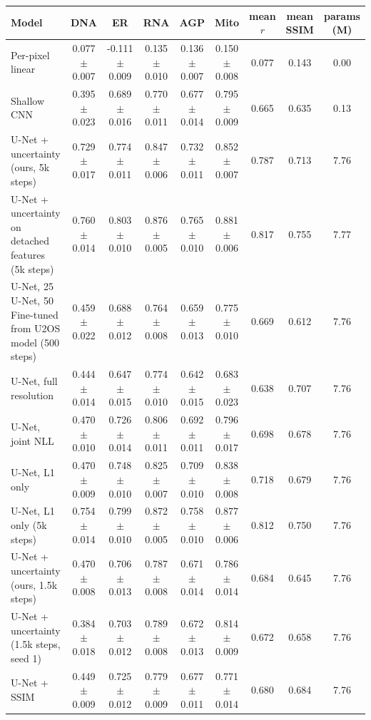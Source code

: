 \begin{tabular}{lcccccccc}
\toprule
Model & DNA & ER & RNA & AGP & Mito & mean $r$ & mean SSIM & params (M) \\
\midrule
Per-pixel linear & 0.077 $\pm$ 0.007 & -0.111 $\pm$ 0.009 & 0.135 $\pm$ 0.010 & 0.136 $\pm$ 0.007 & 0.150 $\pm$ 0.008 & 0.077 & 0.143 & 0.00 \\
Shallow CNN & 0.395 $\pm$ 0.023 & 0.689 $\pm$ 0.016 & 0.770 $\pm$ 0.011 & 0.677 $\pm$ 0.014 & 0.795 $\pm$ 0.009 & 0.665 & 0.635 & 0.13 \\
U-Net + uncertainty (ours, 5k steps) & 0.729 $\pm$ 0.017 & 0.774 $\pm$ 0.011 & 0.847 $\pm$ 0.006 & 0.732 $\pm$ 0.011 & 0.852 $\pm$ 0.007 & 0.787 & 0.713 & 7.76 \\
U-Net + uncertainty on detached features (5k steps) & 0.760 $\pm$ 0.014 & 0.803 $\pm$ 0.010 & 0.876 $\pm$ 0.005 & 0.765 $\pm$ 0.010 & 0.881 $\pm$ 0.006 & 0.817 & 0.755 & 7.77 \\
U-Net, 25%
U-Net, 50%
Fine-tuned from U2OS model (500 steps) & 0.459 $\pm$ 0.022 & 0.688 $\pm$ 0.012 & 0.764 $\pm$ 0.008 & 0.659 $\pm$ 0.013 & 0.775 $\pm$ 0.010 & 0.669 & 0.612 & 7.76 \\
U-Net, full resolution & 0.444 $\pm$ 0.014 & 0.647 $\pm$ 0.015 & 0.774 $\pm$ 0.010 & 0.642 $\pm$ 0.015 & 0.683 $\pm$ 0.023 & 0.638 & 0.707 & 7.76 \\
U-Net, joint NLL & 0.470 $\pm$ 0.010 & 0.726 $\pm$ 0.014 & 0.806 $\pm$ 0.011 & 0.692 $\pm$ 0.011 & 0.796 $\pm$ 0.017 & 0.698 & 0.678 & 7.76 \\
U-Net, L1 only & 0.470 $\pm$ 0.009 & 0.748 $\pm$ 0.010 & 0.825 $\pm$ 0.007 & 0.709 $\pm$ 0.010 & 0.838 $\pm$ 0.008 & 0.718 & 0.679 & 7.76 \\
U-Net, L1 only (5k steps) & 0.754 $\pm$ 0.014 & 0.799 $\pm$ 0.010 & 0.872 $\pm$ 0.005 & 0.758 $\pm$ 0.010 & 0.877 $\pm$ 0.006 & 0.812 & 0.750 & 7.76 \\
U-Net + uncertainty (ours, 1.5k steps) & 0.470 $\pm$ 0.008 & 0.706 $\pm$ 0.013 & 0.787 $\pm$ 0.008 & 0.671 $\pm$ 0.014 & 0.786 $\pm$ 0.014 & 0.684 & 0.645 & 7.76 \\
U-Net + uncertainty (1.5k steps, seed 1) & 0.384 $\pm$ 0.018 & 0.703 $\pm$ 0.012 & 0.789 $\pm$ 0.008 & 0.672 $\pm$ 0.013 & 0.814 $\pm$ 0.009 & 0.672 & 0.658 & 7.76 \\
U-Net + SSIM & 0.449 $\pm$ 0.009 & 0.725 $\pm$ 0.012 & 0.779 $\pm$ 0.009 & 0.677 $\pm$ 0.011 & 0.771 $\pm$ 0.014 & 0.680 & 0.684 & 7.76 \\
\bottomrule
\end{tabular}
